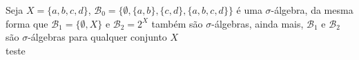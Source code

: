\begin{exemplo}
    
    Seja \(X=\{ a,b,c,d \} \),  $ \mathcal{B}_0 = \{ \emptyset, \{a,b\},\{c,d\}, \{a,b,c,d\} \}$
    é uma $\sigma$-álgebra, da mesma forma que $\mathcal{B}_1 = \{ \emptyset, X \} $ e 
    $\mathcal{B}_2 = 2^X $ também são $\sigma$-álgebras, ainda mais, $\mathcal{B}_1$ e 
    $\mathcal{B}_2$ são $\sigma$-álgebras para qualquer conjunto $X$ \\
    teste

\end{exemplo}    
    
    



